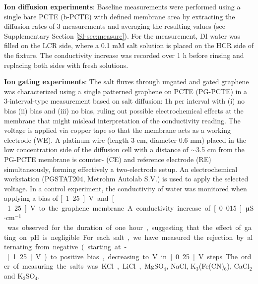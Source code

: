 \documentclass[journal=nalefd,email=true, hyperref=true, keywords=false]{achemso}
\begin{document}
\vspace{1em}
\noindent
\textbf{Ion diffusion experiments}: { Baseline measurements were
performed using a single bare PCTE (b-PCTE) with defined membrane area} by extracting the diffusion rates
of 3 measurements and averaging the resulting values (see
Supplementary Section \ref{SI-sec:measure}). For the measurement, DI water was filled on
the LCR side, where a 0.1 mM salt solution is placed on the HCR side
of the fixture. The conductivity increase was recorded over 1 h before
rinsing and replacing both sides with fresh solutions.

\vspace{1em}
\noindent
\textbf{Ion gating experiments}: 
{ The salt fluxes through ungated and gated graphene
was characterized using a single patterned graphene on PCTE (PG-PCTE)} 
in a 3-interval-type measurement based on salt diffusion: 1h per interval
with (i) no bias (ii) bias and (iii) no bias, ruling out possible
electrochemical effects at the membrane that might mislead
interpretation of the conductivity reading. The voltage is applied via
copper tape so that the membrane acts as a working electrode (WE). A
platinum wire (length 3 cm, diameter 0.6 mm) placed in the low
concentration side of the diffusion cell with a distance of $\sim$3.5 cm
from the PG-PCTE membrane is counter- (CE) and reference electrode
(RE) simultaneously, forming effectively a two-electrode setup. An
electrochemical workstation (PGSTAT204, Metrohm Autolab S.V.) is used
to apply the selected voltage.
{ In a control experiment, the conductivity of water was monitored when applying a bias of \unit[1.25]{V} and \unit[-1.25]{V} to the graphene membrane. A conductivity increase of \unit[0.015]{$\muup$S$\cdot$cm$^{-1}$} was observed for the duration of one hour, suggesting that the effect of gating on pH is negligible.

  For each salt, we have measured the rejection by alternating from
  negative (starting at -\unit[1.25]{V}) to positive bias, decreasing
  to \unit[0]{V} in \unit[0.25]{V} steps. The order of measuring the
  salts was KCl, LiCl, MgSO$_4$, NaCl, K$_3$(Fe(CN)$_6$), CaCl$_2$ and
  K$_2$SO$_4$.}
\end{document}
